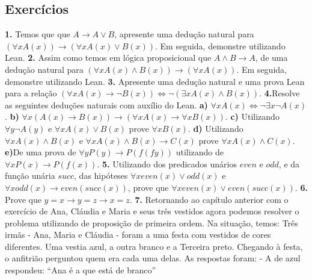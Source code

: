 \subsection{Exercícios}
\textbf{1.} Temos que 
que $A \to A \lor B$, apresente uma dedução natural 
para $(\forall x A (x)) \to (\forall x A(x)\lor B(x))$. Em seguida,
demonstre utilizando Lean.
\newline \textbf{2.} Assim como temos em lógica proposicional
 que $A \land B \to A$, de uma dedução natural para 
 $(\forall x A (x) \land B(x)) \to (\forall x A(x))$. Em seguida,
 demonstre utilizando Lean.
\newline \textbf{3.} Apresente uma dedução natural e uma
prova Lean para a relação $(\forall x A(x) \to \neg B(x)) \iff \neg (\exists x A(x) \land B(x))$.
 \newline \textbf{4.}Resolve as seguintes deduções naturais com auxílio do Lean.
\newline \textbf{a)} $\forall x A(x) \iff \neg \exists x \neg A(x)$.
\newline \textbf{b)} $\forall x(A(x) \to B(x)) \to (\forall x A(x) \to \forall x B(x))$.
\newline \textbf{c)} Utilizando $\forall y \neg A (y)$ e $\forall x A(x)
\lor B(x)$ prove $\forall x B(x)$.
\newline \textbf{d)} Utilizando $\forall x A(x) \land B(x)$ e 
$\forall x A(x) \land B(x) \to C(x)$ prove $\forall x A(x) \land C(x)$.
\newline \textbf{e)}De uma prova de $\forall y P(y) \to P(f (f y))$ utilizando 
de $\forall x P(x) \to P(f(x))$.
\newline \textbf{5.} Utilizando dos predicados unários 
$even$ e $odd$, e da função unária $succ$, das hipóteses
$\forall x even(x) \lor odd(x)$ e $\forall x odd(x) \to even(succ(x))$,
prove que $\forall x even(x) \lor even(succ(x))$.
\newline \textbf{6.} Prove que $y = x → y = z → x = z$.
\newline \textbf{7.} Retornando ao capítulo anterior com o exercício de Ana, Cláudia e Maria e seus três vestidos
agora podemos resolver o problema utilizando de proposição de primeira ordem. Na situação, temos: 
\newline Três irmãs - Ana, Maria e Cláudia - foram a uma festa com vestidos de
cores diferentes. Uma vestia azul, a outra branco e a Terceira
preto. Chegando à festa, o anfitrião perguntou quem era cada uma
delas. As respostas foram:
\newline - A de azul respondeu: “Ana é a que está de branco”
